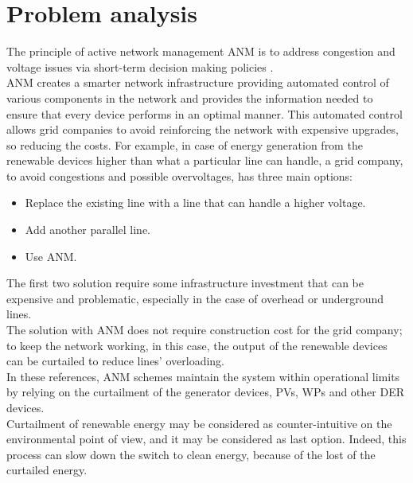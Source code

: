 \chapter{Problem analysis}
\label{chapter4}
The principle of active network management \gls{ANM} is to address congestion and voltage issues via short-term decision making policies \cite{ANMQuentin}. \\
\gls{ANM} creates a smarter network infrastructure providing automated control of various components in the network and provides the information needed to ensure that every device performs in an optimal manner. This automated control allows grid companies to avoid reinforcing the network with expensive upgrades, so reducing the costs.
For example, in case of energy generation from the renewable devices higher than what a particular line can handle, a grid company, to avoid congestions and possible overvoltages, has three main options:
\begin{itemize}
    \item Replace the existing line with a line that can handle a higher voltage.
    \item Add another parallel line.
    \item Use \gls{ANM}.
\end{itemize}
The first two solution require some infrastructure investment that can be expensive and problematic, especially in the case of overhead or underground lines.\\
The solution with \gls{ANM} does not require construction cost for the grid company; to keep the network working, in this case, the output of the renewable devices can be curtailed to reduce lines' overloading. \\

In these references, \gls{ANM} schemes maintain the system within operational limits by relying on the curtailment of the generator devices, \glspl{PV}, \glspl{WP} and other \gls{DER} devices. \\
Curtailment of renewable energy may be considered as counter-intuitive on the environmental point of view, and it may be considered as last option. Indeed, this process can slow down the switch to clean energy, because of the lost of the curtailed energy. \\

